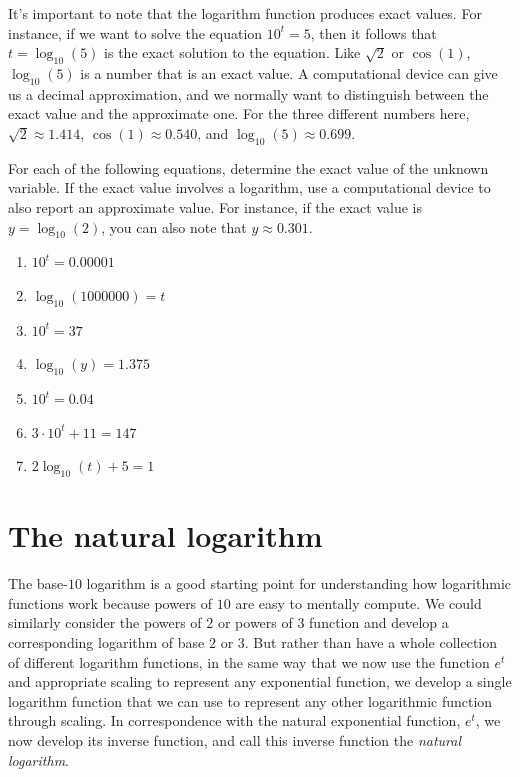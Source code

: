 \documentclass[nooutcomes]{ximera}
\begin{document}
It's important to note that the logarithm function produces exact values.  For instance, if we want to solve the equation \(10^t = 5\), then it follows that \(t = \log_{10}(5)\) is the exact solution to the equation.  Like \(\sqrt{2}\) or \(\cos(1)\), \(\log_{10}(5)\) is a number that is an exact value.  A computational device can give us a decimal approximation, and we normally want to distinguish between the exact value and the approximate one.  For the three different numbers here, \(\sqrt{2} \approx 1.414\), \(\cos(1) \approx 0.540\), and \(\log_{10}(5) \approx 0.699\).%
\begin{exploration}

For each of the following equations, determine the exact value of the unknown variable.  If the exact value involves a logarithm, use a computational device to also report an approximate value.  For instance, if the exact value is \(y = \log_{10}(2)\), you can also note that \(y \approx 0.301\).%


\begin{enumerate}[label=\alph*.]
\item
\(10^t = 0.00001\)%
\item
\(\log_{10}(1000000) = t\)%
\item
\(10^t = 37\)%
\item
\(\log_{10}(y) = 1.375\)%
\item
\(10^t = 0.04\)%
\item
\(3 \cdot 10^t + 11 = 147\)%
\item
\(2\log_{10}(t) + 5 = 1\)%
\end{enumerate}

%
\end{exploration}

%
%
%
\section{The natural logarithm}
The base-\(10\) logarithm is a good starting point for understanding how logarithmic functions work because powers of \(10\) are easy to mentally compute.  We could similarly consider the powers of \(2\) or powers of \(3\) function and develop a corresponding logarithm of base \(2\) or \(3\).  But rather than have a whole collection of different logarithm functions, in the same way that we now use the function \(e^t\) and appropriate scaling to represent any exponential function, we develop a single logarithm function that we can use to represent any other logarithmic function through scaling.  In correspondence with the natural exponential function, \(e^t\), we now develop its inverse function, and call this inverse function the \emph{natural logarithm}.%
\end{document}
